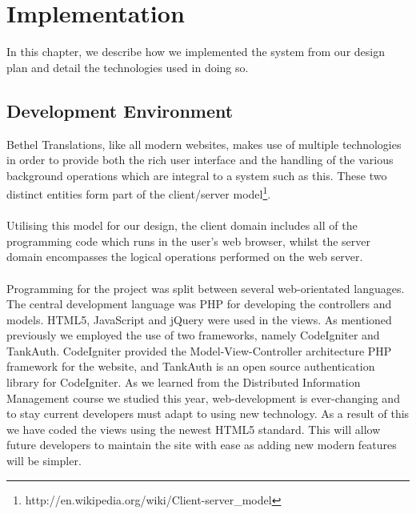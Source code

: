 \documentclass{l3proj}
\begin{document}
\chapter{Implementation}
\label{chap:impl}

In this chapter, we describe how we implemented the system from our design plan
and detail the technologies used in doing so.


\section{Development Environment}
\label{sect:dev-env}
Bethel Translations, like all modern websites, makes use of multiple
technologies in order to provide both the rich user interface and the handling
of the various background operations which are integral to a system such as this.
These two distinct entities form part of the client/server
model\footnote{http://en.wikipedia.org/wiki/Client-server\_model}.\\
\\
Utilising this model for our design, the client domain includes all of the programming code which runs in the
user's web browser, whilst the server domain encompasses the logical operations
performed on the web server.\\
\\
Programming for the project was split between several web-orientated languages.
The central development language was PHP for developing the controllers and
models. HTML5, JavaScript and jQuery were used in the views. As mentioned
previously we employed the use of two frameworks, namely CodeIgniter and
TankAuth. CodeIgniter provided the Model-View-Controller architecture PHP
framework for the website, and TankAuth is an open source authentication library
for CodeIgniter.\newline
\newline
As we learned from the Distributed Information Management course we studied this
year, web-development is ever-changing and to stay current developers must adapt
to using new technology. As a result of this we have coded the views using the
newest HTML5 standard. This will allow future developers to maintain the site
with ease as adding new modern features will be simpler.\newline
\newline
\end{document}
